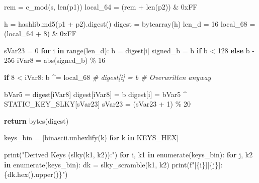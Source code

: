 \documentclass[
]{article}
\newenvironment{Shaded}{}{}
\newcommand{\BaseNTok}[1]{\textcolor[rgb]{0.25,0.63,0.44}{#1}}
\newcommand{\BuiltInTok}[1]{\textcolor[rgb]{0.00,0.50,0.00}{#1}}
\newcommand{\CommentTok}[1]{\textcolor[rgb]{0.38,0.63,0.69}{\textit{#1}}}
\newcommand{\ControlFlowTok}[1]{\textcolor[rgb]{0.00,0.44,0.13}{\textbf{#1}}}
\newcommand{\DecValTok}[1]{\textcolor[rgb]{0.25,0.63,0.44}{#1}}
\newcommand{\KeywordTok}[1]{\textcolor[rgb]{0.00,0.44,0.13}{\textbf{#1}}}
\newcommand{\NormalTok}[1]{#1}
\newcommand{\OperatorTok}[1]{\textcolor[rgb]{0.40,0.40,0.40}{#1}}
\newcommand{\SpecialCharTok}[1]{\textcolor[rgb]{0.25,0.44,0.63}{#1}}
\newcommand{\SpecialStringTok}[1]{\textcolor[rgb]{0.73,0.40,0.53}{#1}}
\newcommand{\StringTok}[1]{\textcolor[rgb]{0.25,0.44,0.63}{#1}}
\begin{document}
\begin{Shaded}
\begin{Highlighting}[]
\NormalTok{    rem }\OperatorTok{=}\NormalTok{ c\_mod(s, }\BuiltInTok{len}\NormalTok{(p1))}
\NormalTok{    local\_64 }\OperatorTok{=}\NormalTok{ (rem }\OperatorTok{+} \BuiltInTok{len}\NormalTok{(p2)) }\OperatorTok{\&} \BaseNTok{0xFF}
    
\NormalTok{    h }\OperatorTok{=}\NormalTok{ hashlib.md5(p1 }\OperatorTok{+}\NormalTok{ p2).digest()}
\NormalTok{    digest }\OperatorTok{=} \BuiltInTok{bytearray}\NormalTok{(h)}
\NormalTok{    len\_d }\OperatorTok{=} \DecValTok{16}
\NormalTok{    local\_68 }\OperatorTok{=}\NormalTok{ (local\_64 }\OperatorTok{+} \DecValTok{8}\NormalTok{) }\OperatorTok{\&} \BaseNTok{0xFF}
    
\NormalTok{    sVar23 }\OperatorTok{=} \DecValTok{0}
    \ControlFlowTok{for}\NormalTok{ i }\KeywordTok{in} \BuiltInTok{range}\NormalTok{(len\_d):}
\NormalTok{        b }\OperatorTok{=}\NormalTok{ digest[i]}
\NormalTok{        signed\_b }\OperatorTok{=}\NormalTok{ b }\ControlFlowTok{if}\NormalTok{ b }\OperatorTok{\textless{}} \DecValTok{128} \ControlFlowTok{else}\NormalTok{ b }\OperatorTok{{-}} \DecValTok{256}
\NormalTok{        iVar8 }\OperatorTok{=} \BuiltInTok{abs}\NormalTok{(signed\_b) }\OperatorTok{\%} \DecValTok{16}
        
        \ControlFlowTok{if} \DecValTok{8} \OperatorTok{\textless{}}\NormalTok{ iVar8:}
\NormalTok{            b }\OperatorTok{\^{}=}\NormalTok{ local\_68}
            \CommentTok{\# digest[i] = b  \# Overwritten anyway}
            
\NormalTok{        bVar5 }\OperatorTok{=}\NormalTok{ digest[iVar8]}
\NormalTok{        digest[iVar8] }\OperatorTok{=}\NormalTok{ b}
\NormalTok{        digest[i] }\OperatorTok{=}\NormalTok{ bVar5 }\OperatorTok{\^{}}\NormalTok{ STATIC\_KEY\_SLKY[sVar23]}
\NormalTok{        sVar23 }\OperatorTok{=}\NormalTok{ (sVar23 }\OperatorTok{+} \DecValTok{1}\NormalTok{) }\OperatorTok{\%} \DecValTok{20}
        
    \ControlFlowTok{return} \BuiltInTok{bytes}\NormalTok{(digest)}

\NormalTok{keys\_bin }\OperatorTok{=}\NormalTok{ [binascii.unhexlify(k) }\ControlFlowTok{for}\NormalTok{ k }\KeywordTok{in}\NormalTok{ KEYS\_HEX]}

\BuiltInTok{print}\NormalTok{(}\StringTok{"Derived Keys (slky(k1, k2)):"}\NormalTok{)}
\ControlFlowTok{for}\NormalTok{ i, k1 }\KeywordTok{in} \BuiltInTok{enumerate}\NormalTok{(keys\_bin):}
    \ControlFlowTok{for}\NormalTok{ j, k2 }\KeywordTok{in} \BuiltInTok{enumerate}\NormalTok{(keys\_bin):}
\NormalTok{        dk }\OperatorTok{=}\NormalTok{ slky\_scramble(k1, k2)}
        \BuiltInTok{print}\NormalTok{(}\SpecialStringTok{f"[}\SpecialCharTok{\{}\NormalTok{i}\SpecialCharTok{\}}\SpecialStringTok{][}\SpecialCharTok{\{}\NormalTok{j}\SpecialCharTok{\}}\SpecialStringTok{]: }\SpecialCharTok{\{}\NormalTok{dk}\SpecialCharTok{.}\BuiltInTok{hex}\NormalTok{()}\SpecialCharTok{.}\NormalTok{upper()}\SpecialCharTok{\}}\SpecialStringTok{"}\NormalTok{)}


\end{Highlighting}
\end{Shaded}
\end{document}
